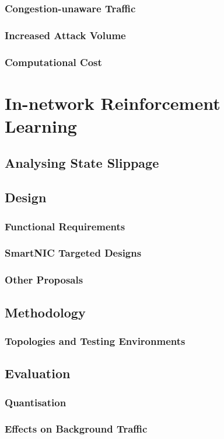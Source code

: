 \documentclass[twoside,hidelinks]{glasgowthesis}
\begin{document}
\subsection{Congestion-unaware Traffic}
\subsection{Increased Attack Volume}
\subsection{Computational Cost}

\chapter{In-network Reinforcement Learning}
\section{Analysing State Slippage}
\section{Design}
\subsection{Functional Requirements}
\subsection{SmartNIC Targeted Designs}
\subsection{Other Proposals}
\section{Methodology}
\subsection{Topologies and Testing Environments}
\section{Evaluation}
\subsection{Quantisation}
\subsection{Effects on Background Traffic}
\end{document}
